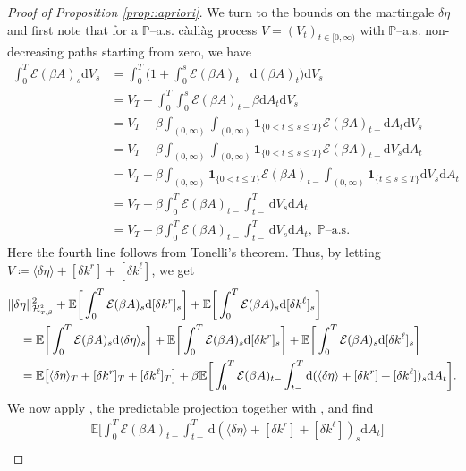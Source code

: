 \documentclass[10pt]{article} %
\newcommand\cE{\mathcal E}
\newcommand\cH{\mathcal H}
\newcommand{\smalltext}[1]{\text{\fontsize{4}{4}\selectfont$#1$}}
\def \E{\mathbb{E}}
\def \P{\mathbb{P}}
\newcommand{\1}{\mathbf{1}}
\def\d{\mathrm{d}}
\begin{document}
\begin{proof}[Proof of Proposition \ref{prop::apriori}]
\medskip
We turn to the bounds on the martingale $\delta\eta$ and first note that for a $\P$--a.s. c\`adl\`ag process $V = (V_t)_{t \in [0,\infty)}$ with $\P$--a.s. non-decreasing paths starting from zero, we have
\begin{align}\label{eq::weighted_norm_V}
	\int_0^T \cE(\beta A)_s \d V_s 
	&= \int_0^T \bigg(1+\int_0^s \cE(\beta A)_{t-}\d(\beta A)_t\bigg) \d V_s \nonumber\\
	&= V_T + \int_0^T \int_0^s \cE(\beta A)_{t-}\beta\d A_t \d V_s \nonumber\\
	&= V_T + \beta \int_{(0,\infty)} \int_{(0,\infty)} \mathbf{1}_{\{0<t\leq s \leq T\}} \cE(\beta A)_{t-} \d A_t \d V_s \nonumber\\
	&= V_T + \beta \int_{(0,\infty)} \int_{(0,\infty)} \mathbf{1}_{\{0<t\leq s \leq T\}} \cE(\beta A)_{t-} \d V_s\d A_t \nonumber\\
	&= V_T + \beta \int_{(0,\infty)} \mathbf{1}_{\{0<t\leq T\}} \cE(\beta A)_{t-} \int_{(0,\infty)} \mathbf{1}_{\{t\leq s \leq T\}} \d V_s\d A_t \nonumber\\
	&= V_T + \beta \int_0^T \cE(\beta A)_{t-} \int_{t-}^T \d V_s\d A_t \nonumber\\
	&= V_T + \beta \int_0^T \cE(\beta A)_{t-} \int_{t-}^T \d V_s\d A_t, \; \text{$\P$--a.s.}
\end{align}
Here the fourth line follows from Tonelli's theorem. Thus, by letting $V \coloneqq \langle\delta\eta\rangle + [\delta k^r] + [\delta k^\ell]$, we get
\begin{align}\label{eq::decompeta}
	&\|\delta\eta\|^2_{\cH^\smalltext{2}_{\smalltext{T}\smalltext{,}\beta}} + \E\bigg[\int_0^T \cE(\beta A)_s \d [\delta k^r]_s\bigg] + \E\bigg[\int_0^T \cE(\beta A)_s \d [\delta k^\ell]_s\bigg] \nonumber\\
	&\quad= \E\bigg[\int_0^T \cE(\beta A)_s \d \langle\delta\eta \rangle_s\bigg] + \E\bigg[\int_0^T \cE(\beta A)_s \d [\delta k^r]_s\bigg] + \E\bigg[\int_0^T \cE(\beta A)_s \d [\delta k^\ell]_s\bigg] \nonumber\\
	&\quad= \E\big[ \langle \delta\eta \rangle_T + [\delta k^r]_T + [\delta k^\ell]_T \big] + \beta \E \bigg[ \int_0^T \cE(\beta A)_{t-} \int_{t-}^T \d (\langle \delta\eta \rangle + [\delta k^r] + [\delta k^\ell])_s \d A_t \bigg].
\end{align}
We now apply \cite[Theorem VI.57]{dellacherie1982probabilities}, the predictable projection together with , and find
\begin{align*}
	&\E \bigg[ \int_0^T \cE(\beta A)_{t-} \int_{t-}^T \d (\langle \delta\eta \rangle + [\delta k^r] + [\delta k^\ell])_s \d A_t \bigg] \\

\end{align*}
\end{proof}
\end{document}
